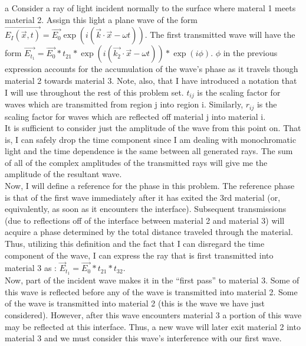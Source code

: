 \begin{homeworkProblem}
\begin{homeworkSection}{a}
Consider a ray of light incident normally to the surface where materal 1 meets material 2. Assign this light a plane wave of the form $\vec{E_I(\vec{x},t)} = \vec{E_0}\exp(i(\vec{k}\cdot\vec{x}-\omega t))$. The first transmitted wave will have the form $\vec{E_{t_1}} = \vec{E_0}*t_{21}*\exp(i(\vec{k_2}\cdot\vec{x}-\omega t))*\exp(i\phi)$. $\phi$ in the previous expression accounts for the accumulation of the wave's phase as it travels though material 2 towards material 3. Note, also, that I have introduced a notation that I will use throughout the rest of this problem set. $t_{ij}$ is the scaling factor for waves which are transmitted from region j into region i. Similarly, $r_{ij}$ is the scaling factor for waves which are reflected off material j into material i. 
\\

It is sufficient to consider just the amplitude of the wave from this point on. That is, I can safely drop the time component since I am dealing with monochromatic light and the time dependence is the same between all generated rays. The sum of all of the complex amplitudes of the transmitted rays will give me the amplitude of the resultant wave.
\\

Now, I will define a reference for the phase in this problem. The reference phase is that of the first wave immediately after it has exited the 3rd material (or, equivalently, as soon as it encounters the interface). Subsequent transmissions (due to reflections off of the interface between material 2 and material 3) will acquire a phase determined by the total distance traveled through the material. Thus, utilizing this definition and the fact that I can disregard the time component of the wave, I can express the ray that is first transmitted into material 3 as : $\vec{E}_{t_1} = \vec{E_0}*t_{21}*t_{32}$.
\\
Now, part of the incident wave makes it in the ``first pass'' to material 3. Some of this wave is reflected before any of the wave is transmitted into material 2. Some of the wave is transmitted into material 2 (this is the wave we have just considered). However, after this wave encounters material 3 a portion of this wave may be reflected at this interface. Thus, a new wave will later exit material 2 into material 3 and we must consider this wave's interference with our first wave.
\\


\end{homeworkSection}
\end{homeworkProblem}
